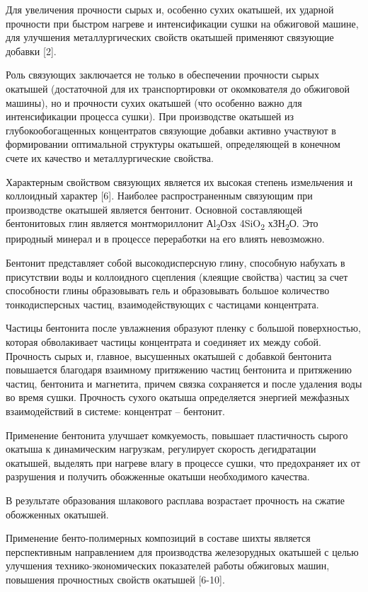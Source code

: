 Для увеличения прочности сырых и, особенно сухих окатышей, их ударной
прочности при быстром нагреве и интенсификации сушки на обжиговой
машине, для улучшения металлургических свойств окатышей применяют
связующие добавки {[}2{]}.

Роль связующих заключается не только в обеспечении прочности сырых
окатышей (достаточной для их транспортировки от окомкователя до
обжиговой машины), но и прочности сухих окатышей (что особенно важно для
интенсификации процесса сушки). При производстве окатышей из
глубокообогащенных концентратов связующие добавки активно участвуют в
формировании оптимальной структуры окатышей, определяющей в конечном
счете их качество и металлургические свойства.

Характерным свойством связующих является их высокая степень измельчения
и коллоидный характер {[}6{]}. Наиболее распространенным связующим при
производстве окатышей является бентонит. Основной составляющей
бентонитовых глин является монтмориллонит Аl\textsubscript{2}Озх
4SiO\textsubscript{2} хЗН\textsubscript{2}О. Это природный минерал и в
процессе переработки на его влиять невозможно.

Бентонит представляет собой высокодисперсную глину, способную набухать в
присутствии воды и коллоидного сцепления (клеящие свойства) частиц за
счет способности глины образовывать гель и образовывать большое
количество тонкодисперсных частиц, взаимодействующих с частицами
концентрата.

Частицы бентонита после увлажнения образуют пленку с большой
поверхностью, которая обволакивает частицы концентрата и соединяет их
между собой. Прочность сырых и, главное, высушенных окатышей с добавкой
бентонита повышается благодаря взаимному притяжению частиц бентонита и
притяжению частиц, бентонита и магнетита, причем связка сохраняется и
после удаления воды во время сушки. Прочность сухого окатыша
определяется энергией межфазных взаимодействий в системе: концентрат --
бентонит.

Применение бентонита улучшает комкуемость, повышает пластичность сырого
окатыша к динамическим нагрузкам, регулирует скорость дегидратации
окатышей, выделять при нагреве влагу в процессе сушки, что предохраняет
их от разрушения и получить обожженные окатыши необходимого качества.

В результате образования шлакового расплава возрастает прочность на
сжатие обожженных окатышей.

Применение бенто-полимерных композиций в составе шихты является
перспективным направлением для производства железорудных окатышей с
целью улучшения технико-экономических показателей работы обжиговых
машин, повышения прочностных свойств окатышей {[}6-10{]}.

